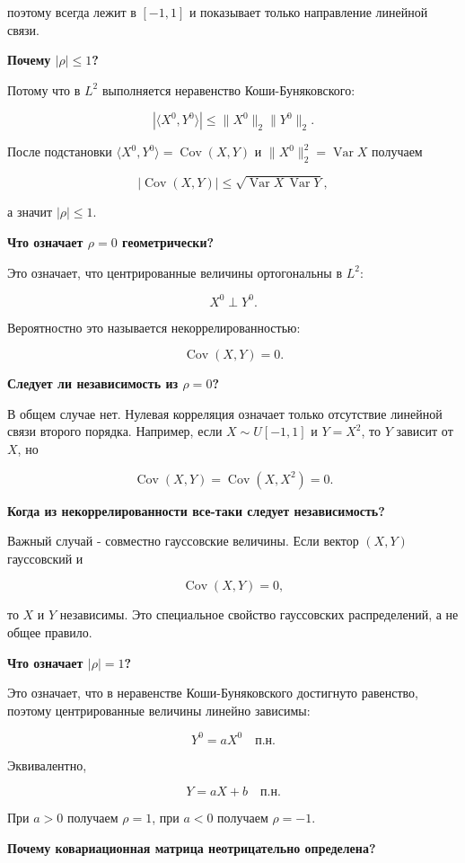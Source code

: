 \documentclass[
  11pt,
  a4paper,
]{article}
\begin{document}
поэтому всегда лежит в \([-1,1]\) и показывает только направление
линейной связи.

\textbf{Почему \(|\rho|\le1\)?}

Потому что в \(L^2\) выполняется неравенство Коши-Буняковского:

\[
|\langle X^0,Y^0\rangle|
\le
\|X^0\|_2\|Y^0\|_2.
\]

После подстановки \(\langle X^0,Y^0\rangle=\operatorname{Cov}(X,Y)\) и
\(\|X^0\|_2^2=\operatorname{Var}X\) получаем

\[
|\operatorname{Cov}(X,Y)|
\le
\sqrt{\operatorname{Var}X\,\operatorname{Var}Y},
\]

а значит \(|\rho|\le1\).

\textbf{Что означает \(\rho=0\) геометрически?}

Это означает, что центрированные величины ортогональны в \(L^2\):

\[
X^0\perp Y^0.
\]

Вероятностно это называется некоррелированностью:

\[
\operatorname{Cov}(X,Y)=0.
\]

\textbf{Следует ли независимость из \(\rho=0\)?}

В общем случае нет. Нулевая корреляция означает только отсутствие
линейной связи второго порядка. Например, если \(X\sim U[-1,1]\) и
\(Y=X^2\), то \(Y\) зависит от \(X\), но

\[
\operatorname{Cov}(X,Y)=\operatorname{Cov}(X,X^2)=0.
\]

\textbf{Когда из некоррелированности все-таки следует независимость?}

Важный случай - совместно гауссовские величины. Если вектор \((X,Y)\)
гауссовский и

\[
\operatorname{Cov}(X,Y)=0,
\]

то \(X\) и \(Y\) независимы. Это специальное свойство гауссовских
распределений, а не общее правило.

\textbf{Что означает \(|\rho|=1\)?}

Это означает, что в неравенстве Коши-Буняковского достигнуто равенство,
поэтому центрированные величины линейно зависимы:

\[
Y^0=aX^0
\quad\text{п.н.}
\]

Эквивалентно,

\[
Y=aX+b
\quad\text{п.н.}
\]

При \(a>0\) получаем \(\rho=1\), при \(a<0\) получаем \(\rho=-1\).

\textbf{Почему ковариационная матрица неотрицательно определена?}
\end{document}
